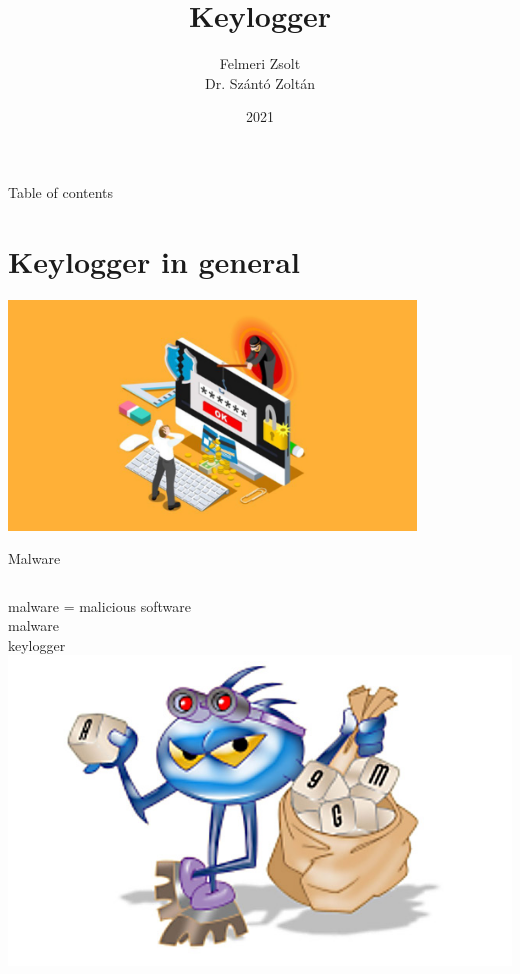 \documentclass{beamer}
\begin{document}
\title{Keylogger}
\author{Felmeri Zsolt\\Dr. Szántó Zoltán}
\date{2021}

\begin{frame}
\titlepage
\end{frame}

\begin{frame}{Table of contents}
\tableofcontents
\end{frame}

\section{Keylogger in general}
\begin{frame}
\includegraphics[width=307pt]{../images/keyloggerimg}
\end{frame}

\begin{frame}{Malware}
\begin{columns}[onlytextwidth]
	malware = malicious software\\
	malware\\
	\hspace{1.75em} keylogger
	 \vspace{0.5em}
	\includegraphics[scale=0.35]{../images/keylogger08132013}
\end{columns}
\end{frame}
\end{document}
